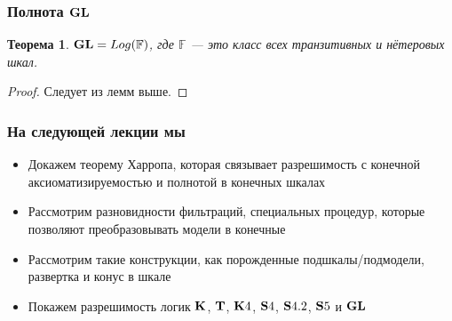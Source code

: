 \documentclass[pdf,utf8,russian,aspectratio=169]{beamer}
\newtheorem{theor}{Теорема}
\begin{document}
  \begin{frame}
    \frametitle{Полнота ${\bf GL}$}
    \begin{theor}
      ${\bf GL} = Log(\mathbb{F})$, где $\mathbb{F}$ --- это класс всех транзитивных и н\"{е}теровых шкал.
    \end{theor}

  \begin{proof}
    Следует из лемм выше.
  \end{proof}
  \end{frame}

\begin{frame}
  \frametitle{На следующей лекции мы}
  \begin{itemize}
    \item Докажем теорему Харропа, которая связывает разрешимость с конечной аксиоматизируемостью и полнотой в конечных шкалах
    \item Рассмотрим разновидности фильтраций, специальных процедур, которые позволяют преобразовывать модели в конечные
    \item Рассмотрим такие конструкции, как порожденные подшкалы/подмодели, развертка и конус в шкале
    \item Покажем разрешимость логик ${\bf K}$, ${\bf T}$, ${\bf K}4$, ${\bf S}4$, ${\bf S}4.2$, ${\bf S}5$ и ${\bf GL}$
  \end{itemize}
\end{frame}
\end{document}
